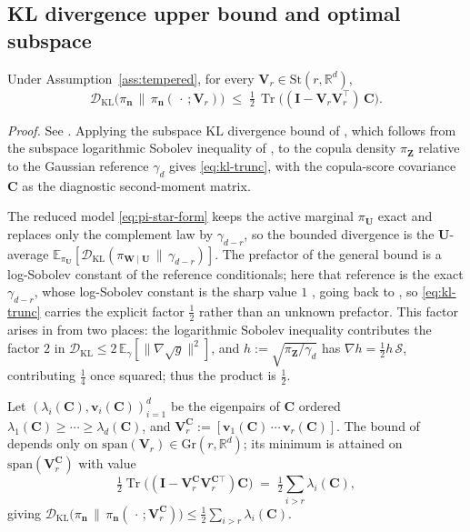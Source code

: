 \documentclass[review,hidelinks,onefignum,onetabnum]{siamart251216}
\newcommand{\RR}{\mathbb{R}}
\newcommand{\EE}{\mathbb{E}}
\newcommand{\DKL}{\mathcal{D}_{\mathrm{KL}}}
\newcommand{\tr}{\operatorname{Tr}}
\newcommand{\gauss}{\gamma}
\newcommand{\mC}{\bm{C}}
\newcommand{\mV}{\bm{V}}
\newcommand{\mI}{\bm{I}}
\newcommand{\St}{\mathrm{St}}
\newcommand{\Gr}{\mathrm{Gr}}
\newcommand{\vn}{\bm{n}}
\newcommand{\vZ}{\bm{Z}}
\newcommand{\vU}{\bm{U}}
\newcommand{\vv}{\bm{v}}
\newcommand{\vW}{\bm{W}}
\newcommand{\scS}{\mathcal{S}}
\begin{document}
\subsection{KL divergence upper bound and optimal subspace}
\label{sec:kl-trunc}

\begin{theorem}
\label{thm:kl-trunc}
Under Assumption~\ref{ass:tempered}, for every $\mV_r \in \St(r,\RR^d)$,
\begin{equation}
  \DKL\bigl(\pi_{\vn} \,\|\, \pi_{\vn}(\,\cdot\,;\mV_r)\bigr) \;\leq\; \tfrac{1}{2}\,\tr\!\bigl((\mI - \mV_r\mV_r^\top)\,\mC\bigr).
  \label{eq:kl-trunc}
\end{equation}
\end{theorem}

\emph{Proof.} See . Applying the subspace KL divergence bound of \cite[Cor.~2.10]{ZahmCuiLawSpantiniMarzouk2022}, which follows from the subspace logarithmic Sobolev inequality of \cite[Thm.~2.9]{ZahmCuiLawSpantiniMarzouk2022}, to the copula density $\pi_{\vZ}$ relative to the Gaussian reference $\gauss_d$ gives \eqref{eq:kl-trunc}, with the copula-score covariance $\mC$ as the diagnostic second-moment matrix.

The reduced model \eqref{eq:pi-star-form} keeps the active marginal $\pi_{\vU}$ exact and replaces only the complement law by $\gauss_{d-r}$, so the bounded divergence is the $\vU$-average $\EE_{\pi_{\vU}}[\DKL(\pi_{\vW\mid\vU}\,\|\,\gauss_{d-r})]$. The prefactor of the general bound is a log-Sobolev constant of the reference conditionals; here that reference is the exact $\gauss_{d-r}$, whose log-Sobolev constant is the sharp value $1$ \cite[Prop.~5.5.1]{BakryGentilLedoux2014}, going back to \cite{Gross1975}, so \eqref{eq:kl-trunc} carries the explicit factor $\tfrac12$ rather than an unknown prefactor. This factor arises in  from two places: the logarithmic Sobolev inequality contributes the factor $2$ in $\DKL \le 2\,\EE_{\gauss}[\|\nabla\sqrt{g}\|^2]$, and $h := \sqrt{\pi_{\vZ}/\gauss_d}$ has $\nabla h = \tfrac12 h\,\scS$, contributing $\tfrac14$ once squared; thus the product is $\tfrac12$.

\begin{corollary}
\label{cor:optimal-subspace}
Let $(\lambda_i(\mC), \vv_i(\mC))_{i=1}^d$ be the eigenpairs of $\mC$ ordered $\lambda_1(\mC) \ge \cdots \ge \lambda_d(\mC)$, and $\mV_r^{\mC} := [\vv_1(\mC)\,\cdots\,\vv_r(\mC)]$. The bound of  depends only on $\mathrm{span}(\mV_r) \in \Gr(r,\RR^d)$; its minimum is attained on $\mathrm{span}(\mV_r^{\mC})$ with value
\[
  \tfrac{1}{2}\tr\!\bigl((\mI-\mV_r^{\mC}\mV_r^{\mC\top})\mC\bigr) \;=\; \tfrac{1}{2}\sum_{i > r}\lambda_i(\mC),
\]
giving $\DKL\bigl(\pi_{\vn}\,\|\,\pi_{\vn}(\,\cdot\,;\mV_r^{\mC})\bigr) \leq \tfrac{1}{2}\sum_{i>r}\lambda_i(\mC)$.
\end{corollary}
\end{document}
